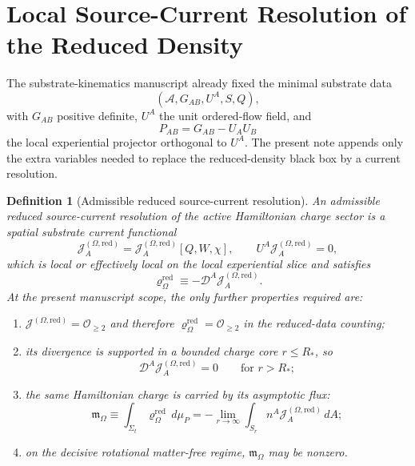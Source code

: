 \documentclass[11pt]{article}
\newcommand{\Sub}{\mathcal{A}}
\newcommand{\ProjSub}{P}
\newcommand{\SpatialD}{\mathcal D}
\newcommand{\SourceDensityRed}{\varrho_\Omega^{\mathrm{red}}}
\newcommand{\SourceCurrentRed}{\mathcal J^{(\Omega,\mathrm{red})}}
\newcommand{\HamChargeOmega}{\mathfrak m_\Omega}
\newtheorem{definition}{Definition}
\begin{document}
\section{Local Source-Current Resolution of the Reduced Density}

The substrate-kinematics manuscript already fixed the minimal substrate data
\[
(\Sub,G_{AB},U^A,S,Q),
\]
with \(G_{AB}\) positive definite, \(U^A\) the unit ordered-flow field, and
\begin{equation}
\ProjSub_{AB}=G_{AB}-U_AU_B
\label{eq:projector}
\end{equation}
the local experiential projector orthogonal to \(U^A\). The present note appends only the extra variables needed to replace the reduced-density black box by a current resolution.

\begin{definition}[Admissible reduced source-current resolution]
\label{def:currentresolution}
An \emph{admissible reduced source-current resolution} of the active Hamiltonian charge sector is a spatial substrate current functional
\begin{equation}
\SourceCurrentRed_A=\SourceCurrentRed_A[Q,W,\chi],
\qquad
U^A\SourceCurrentRed_A=0,
\label{eq:Jred}
\end{equation}
which is local or effectively local on the local experiential slice and satisfies
\begin{equation}
\SourceDensityRed
\equiv
-\SpatialD^A \SourceCurrentRed_A.
\label{eq:rhorfromJ}
\end{equation}
At the present manuscript scope, the only further properties required are:
\begin{enumerate}
    \item \(\SourceCurrentRed=\mathcal O_{\ge 2}\) and therefore \(\SourceDensityRed=\mathcal O_{\ge 2}\) in the reduced-data counting;
    \item its divergence is supported in a bounded charge core \(r\le R_\ast\), so
    \begin{equation}
    \SpatialD^A\SourceCurrentRed_A=0
    \qquad
    \text{for } r>R_\ast;
    \label{eq:exteriorcurrent}
    \end{equation}
    \item the same Hamiltonian charge is carried by its asymptotic flux:
    \begin{equation}
    \HamChargeOmega
    \equiv
    \int_{\Sigma_t}\SourceDensityRed\,d\mu_P
    =
    -\lim_{r\to\infty}\int_{S_r} n^A\SourceCurrentRed_A\,dA;
    \label{eq:charge}
    \end{equation}
    \item on the decisive rotational matter-free regime, \(\HamChargeOmega\) may be nonzero.
\end{enumerate}
\end{definition}
\end{document}

